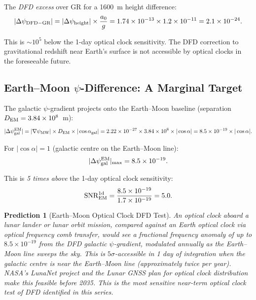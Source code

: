 \documentclass[aps,prd,twocolumn,superscriptaddress,nofootinbib]{revtex4-2}
\newtheorem{prediction}{Prediction}
\begin{document}
The \emph{DFD excess} over GR for a 1600~m height difference:
\begin{equation}
|\Delta\psi_{\rm DFD-GR}| = |\Delta\psi_{\rm height}|\times\frac{a_0}{g}
= 1.74\times10^{-13}\times1.2\times10^{-11}
= 2.1\times10^{-24}.
\label{eq:dfd_excess}
\end{equation}

This is $\sim 10^5$ below the 1-day optical clock sensitivity. The
DFD correction to gravitational redshift near Earth's surface is not
accessible by optical clocks in the foreseeable future.

\subsection{Earth--Moon $\psi$-Difference: A Marginal Target}

The galactic $\psi$-gradient projects onto the Earth--Moon baseline
(separation $D_{\rm EM} = 3.84\times10^8$~m):
\begin{equation}
|\Delta\psi_{\rm gal}^{\rm EM}|
= |\nabla\psi_{\rm MW}|\times D_{\rm EM}\times|\cos\alpha_{\rm gal}|
= 2.22\times10^{-27}\times3.84\times10^8\times|\cos\alpha|
= 8.5\times10^{-19}\times|\cos\alpha|.
\label{eq:EM_psi}
\end{equation}

For $|\cos\alpha| = 1$ (galactic centre on the Earth--Moon line):
\begin{equation}
|\Delta\psi_{\rm gal}^{\rm EM}|_{\rm max} = 8.5\times10^{-19}.
\end{equation}

This is \emph{5 times above} the 1-day optical clock sensitivity:
\begin{equation}
{\rm SNR}_{\rm EM}^{1\rm d} = \frac{8.5\times10^{-19}}{1.7\times10^{-19}} = 5.0.
\label{eq:EM_snr}
\end{equation}

\begin{prediction}[Earth--Moon Optical Clock DFD Test]
\label{pred:EM_optical}
An optical clock aboard a lunar lander or lunar orbit mission, compared
against an Earth optical clock via optical frequency comb transfer,
would see a fractional frequency anomaly of up to $8.5\times10^{-19}$
from the DFD galactic $\psi$-gradient, modulated annually as the
Earth--Moon line sweeps the sky. This is $5\sigma$-accessible in 1 day
of integration when the galactic centre is near the Earth--Moon line
(approximately twice per year). NASA's LunaNet project and the
Lunar GNSS plan for optical clock distribution make this feasible
before 2035. This is the most sensitive near-term optical clock test
of DFD identified in this series.
\end{prediction}
\end{document}
